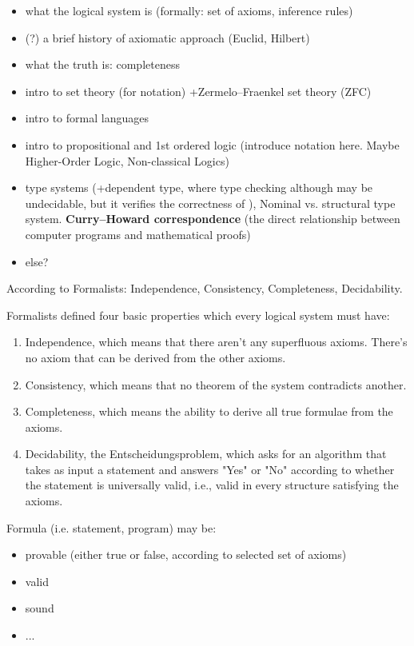 \documentclass[article]{aaltoseries}
\begin{document}
\begin{itemize}
\itemsep0em
	\item what the logical system is (formally: set of axioms, inference rules)
	\item (?) a brief history of axiomatic approach (Euclid, Hilbert)
	\item what the truth is: completeness
	\item intro to set theory (for notation) +Zermelo–Fraenkel set theory (ZFC)
	\item intro to formal languages
	\item intro to propositional and 1st ordered logic (introduce notation here. Maybe Higher-Order Logic, Non-classical Logics)
	\item type systems (+dependent type, where type checking although may be undecidable, but it verifies the correctness of ), Nominal vs. structural type system. \textbf{Curry–Howard correspondence} (the direct relationship between computer programs and mathematical proofs)
	\item else?
\end{itemize}

According to Formalists: Independence, Consistency, Completeness, Decidability.

Formalists defined four basic properties which every logical system must have:
\begin{enumerate}
\itemsep0em
	\item Independence, which means that there aren’t any superfluous axioms. There’s no axiom that can be derived from the other axioms.
	\item Consistency, which means that no theorem of the system contradicts another.
	\item Completeness, which means the ability to derive all true formulae from the axioms.
	\item Decidability, the Entscheidungsproblem, which asks for an algorithm that takes as input a statement and answers "Yes" or "No" according to whether the statement is universally valid, i.e., valid in every structure satisfying the axioms.
\end{enumerate}

Formula (i.e. statement, program) may be:
\begin{itemize}
\itemsep0em
	\item provable (either true or false, according to selected set of axioms)
	\item valid
	\item sound
	\item ...
\end{itemize}
\end{document}
